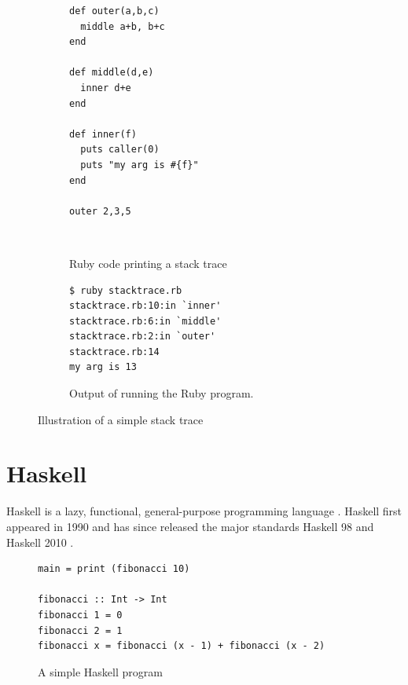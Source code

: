 \begin{figure}
\begin{mdframed}
  \begin{subfigure}[t]{0.5\textwidth}
      \begin{verbatim}
def outer(a,b,c)
  middle a+b, b+c
end

def middle(d,e)
  inner d+e
end

def inner(f)
  puts caller(0)
  puts "my arg is #{f}"
end

outer 2,3,5
       \end{verbatim}
    \caption{Ruby code printing a stack trace}
    ~ %
  \end{subfigure}
        \begin{subfigure}[t]{0.5\textwidth}
          \begin{verbatim}
$ ruby stacktrace.rb
stacktrace.rb:10:in `inner'
stacktrace.rb:6:in `middle'
stacktrace.rb:2:in `outer'
stacktrace.rb:14
my arg is 13
          \end{verbatim}
          \caption{Output of running the Ruby program.}
        \end{subfigure}
        \caption{Illustration of a simple stack trace
        }\label{fig:ruby_stack_trace}
\end{mdframed}
\end{figure}

\section{Haskell} \label{sec:haskell}

Haskell is a lazy, functional, general-purpose programming language \cite{haskell_report2010}.
Haskell first appeared in 1990 \cite{HistoryOfHaskell2007} and has since
released the major standards Haskell 98 and Haskell 2010
\cite{haskell_report2010}.

\begin{figure}
\begin{mdframed}
  \begin{verbatim}
main = print (fibonacci 10)

fibonacci :: Int -> Int
fibonacci 1 = 0
fibonacci 2 = 1
fibonacci x = fibonacci (x - 1) + fibonacci (x - 2)
  \end{verbatim}
  \caption{A simple Haskell program}
  \label{fig:simple_program}
\end{mdframed}
\end{figure}

